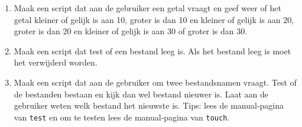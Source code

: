 \begin{enumerate}
\item Maak een script dat aan de gebruiker een getal vraagt en geef weer of het getal kleiner of gelijk is aan 10, groter is dan 10 en kleiner of gelijk is aan 20, groter is dan 20 en kleiner of gelijk is aan 30 of groter is dan 30.
	
\item Maak een script dat test of een bestand leeg is. Als het bestand leeg is moet het verwijderd worden.

\item Maak een script dat aan de gebruiker om twee bestandsnamen vraagt. Test of de bestanden bestaan en kijk dan wel bestand nieuwer is. Laat aan de gebruiker weten welk bestand het nieuwste is. Tips: lees de manual-pagina van \texttt{test} en om te testen lees de manual-pagina van \texttt{touch}.
\end{enumerate}

